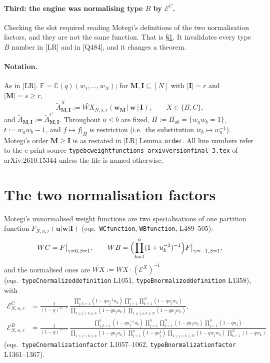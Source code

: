 \documentclass[11pt]{article}
\theoremstyle{plain}
\theoremstyle{definition}
\theoremstyle{remark}
\theoremstyle{plain}
\newcommand{\bI}{\mathbf{I}}
\newcommand{\bM}{\mathbf{M}}
\newcommand{\bu}{\mathbf{u}}
\newcommand{\bw}{\mathbf{w}}
\newcommand{\At}{\widetilde{A}}
\begin{document}
\paragraph{Third: the engine was normalising type $B$ by $\mathcal{E}^C$.}
Checking the slot required reading Motegi's definitions of the two normalisation
factors, and they are not the same function.  That is \S\ref{sec:EB}.  It
invalidates every type $B$ number in [LR] and in [Q484], and it changes a
theorem.

\paragraph{Notation.}
As in [LR].  $\mathbb{F}=\mathbb{C}(q)(w_1,\dots,w_N)$; for
$\bM,\bI\subseteq[N]$ with $|\bI|=r$ and $|\bM|=s\ge r$,
\begin{equation}
\At^X_{\bM,\bI}:=\widetilde{WX}_{N,s,r}(\bw_{\bM}\,|\,\bw\,|\,\bI),
\qquad X\in\{B,C\},
\label{eq:Atdef}
\end{equation}
and $\At_{\bM,\bI}:=\At^C_{\bM,\bI}$.  Throughout $a<b$ are fixed,
$H:=H_{ab}=\{w_aw_b=1\}$, $t:=w_aw_b-1$, and $f\mapsto f|_H$ is restriction
(i.e.\ the substitution $w_b\mapsto w_a^{-1}$).  Motegi's order $\bM\ge\bI$ is
as restated in [LR] Lemma \texttt{order}.  All line numbers refer to the e-print
source \texttt{typebcweightfunctions\_arxivversionfinal-3.tex} of
arXiv:2610.15344 unless the file is named otherwise.

\section{The two normalisation factors}
\label{sec:EB}

Motegi's unnormalised weight functions are two specialisations of one partition
function $F_{N,n,r}(\bu|\bw|\bI)$ (eqs.\ \texttt{WCfunction},
\texttt{WBfunction}, L489--505):
\begin{equation}
WC=F\big|_{\gamma=0,\beta=1},
\qquad
WB=\Bigl(\prod_{k=1}^n(1+u_k^{-1})^{-1}\Bigr)F\big|_{\gamma=-1,\beta=1},
\label{eq:WCWB}
\end{equation}
and the normalised ones are
$\widetilde{WX}:=WX\cdot(\mathcal{E}^X)^{-1}$
(eqs.\ \texttt{typeCnormalizeddefinition} L1051,
\texttt{typeBnormalizeddefinition} L1358), with
\begin{align}
\mathcal{E}^C_{N,n,r}&=\frac{1}{(1-q)^{n-r}}\,
\frac{\prod_{j,k=1}^n(1-qu_j^{-1}u_k)\ \prod_{j=1}^n\prod_{k=1}^N(1-qu_jw_k)}
     {\prod_{1\le j<k\le n}(1-qu_ju_k)\ \prod_{1\le j\le k\le N}(1-qw_jw_k)},
\label{eq:EC}\\[1mm]
\mathcal{E}^B_{N,n,r}&=\frac{1}{(1-q)^{n-r}}\,
\frac{\prod_{j,k=1}^n(1-qu_j^{-1}u_k)\ \prod_{j=1}^n\prod_{k=1}^N(1-qu_jw_k)\
      \prod_{j=1}^n(1-qu_j)}
     {\prod_{1\le j<k\le n}(1-qu_ju_k)\ \prod_{j=1}^n(1-qu_j^2)\
      \prod_{1\le j<k\le N}(1-qw_jw_k)\ \prod_{k=1}^N(1-qw_k)}
\label{eq:EB}
\end{align}
(eqs.\ \texttt{typeCnormalizationfactor} L1057--1062,
\texttt{typeBnormalizationfactor} L1361--1367).
\end{document}
